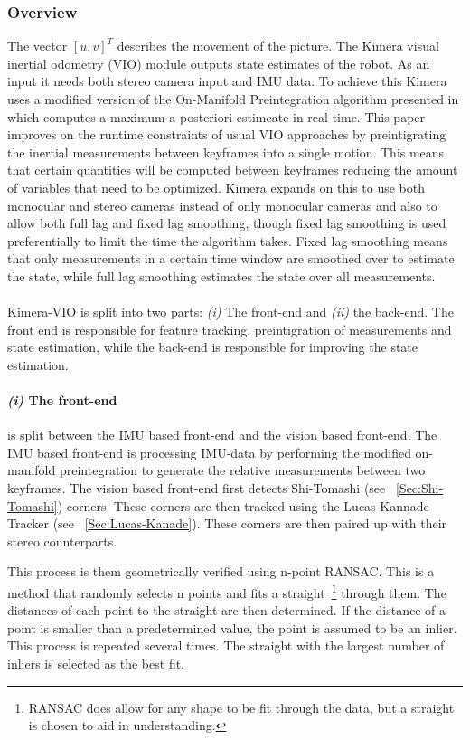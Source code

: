 \documentclass[11pt,a4paper]{article}
\begin{document}
\subsubsection{Overview} \label{Sec:K-VIO overview}
The vector $[u,v]^T$ describes the movement of the picture.
The Kimera visual inertial odometry (VIO) module outputs state estimates of the robot.
As an input it needs both stereo camera input and IMU data. 
To achieve this Kimera uses a modified version of the On-Manifold Preintegration algorithm presented in \cite{Forster_2017} which computes a maximum a posteriori estimeate in real time. 
This paper improves on the runtime constraints of usual VIO approaches by preintigrating the inertial measurements between keyframes into a single motion. 
This means that certain quantities will be computed between keyframes reducing the amount of variables that need to be optimized. 
Kimera expands on this to use both monocular and stereo cameras instead of only monocular cameras and also to allow both full lag and fixed lag smoothing, though fixed lag smoothing is used preferentially to limit the time the algorithm takes.
Fixed lag smoothing means that only measurements in a certain time window are smoothed over to estimate the state, while full lag smoothing estimates the state over all measurements.
\paragraph{}
Kimera-VIO is split into two parts: \textit{(i)} The front-end and \textit{(ii)} the back-end. 
The front end is responsible for feature tracking, preintigration of measurements and state estimation, while the back-end is responsible for improving the state estimation. 
\paragraph{\textit{(i)} The front-end}\label{para:geometric verification} 

is split between the IMU based front-end and the vision based front-end.
The IMU based front-end is processing IMU-data by performing the modified on-manifold preintegration to generate the relative measurements between two keyframes. 
The vision based front-end first detects Shi-Tomashi (see ~\ref{Sec:Shi-Tomashi}) corners. 
These corners are then tracked using the Lucas-Kannade Tracker \cite{lucas1981iterative} (see ~\ref{Sec:Lucas-Kanade}). 
These corners are then paired up with their stereo counterparts.

This process is them geometrically verified using n-point RANSAC. 
This is a method that randomly selects n points and fits a straight~\footnote{RANSAC does allow for any shape to be fit through the data, but a straight is chosen to aid in understanding.} through them.
The distances of each point to the straight are then determined.
If the distance of a point is smaller than a predetermined value, the point is assumed to be an inlier. 
This process is repeated several times. 
The straight with the largest number of inliers is selected as the best fit.
\end{document}
